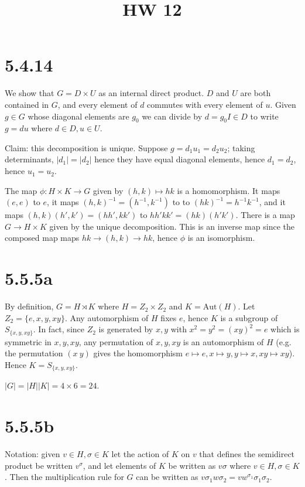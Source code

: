 \documentclass{article}
\title{HW 12}
\date{}
\def\inv{{-1}}
\def\Aut{\textrm{Aut}}
\begin{document}
\maketitle

\section*{5.4.14}

We show that $G = D \times U$ as an internal direct product. $D$ and $U$ are both contained in $G$, and every element of $d$ commutes with every element of $u$. Given $g \in G$ whose diagonal elements are $g_0$ we can divide by $d = g_0I \in D$ to write $g = d u$ where $d \in D, u \in U$.

Claim: this decomposition is unique. Suppose $g = d_1 u_1 = d_2 u_2$; taking determinants, $|d_1| = |d_2|$ hence they have equal diagonal elements, hence $d_1 = d_2$, hence $u_1 = u_2$.

The map $\phi: H \times K \to G$ given by $(h, k) \mapsto h k$ is a homomorphism. It maps $(e, e)$ to $e$, it maps $(h, k)^\inv = (h^\inv, k^\inv)$ to to $(hk)^\inv = h^\inv k^\inv$, and it maps $(h, k)(h', k') = (hh', kk')$ to $hh'kk' = (hk)(h'k')$. There is a map $G \to H \times K$ given by the unique decomposition. This is an inverse map since the composed map maps $hk \to (h, k) \to hk$, hence $\phi$ is an isomorphism.

\section*{5.5.5a}

By definition, $G = H \rtimes K$ where $H = Z_2 \times Z_2$ and $K = \Aut(H)$. Let $Z_2 = \{e, x, y, xy\}$. Any automorphism of $H$ fixes $e$, hence $K$ is a subgroup of $S_{\{x, y, xy\}}$. In fact, since $Z_2$ is generated by $x, y$ with $x^2 = y^2 = (xy)^2 = e$ which is symmetric in $x, y, xy$, any permutation of $x, y, xy$ is an automorphism of $H$ (e.g. the permutation $(x\ y)$ gives the homomorphism $e \mapsto e, x \mapsto y, y \mapsto x, xy \mapsto xy$). Hence $K = S_{\{x, y, xy\}}$.

$|G| = |H||K| = 4 \times 6 = 24$.

\section*{5.5.5b}

Notation: given $v \in H, \sigma \in K$ let the action of $K$ on $v$ that defines the semidirect product be written $v^\sigma$, and let elements of $K$ be written as $v \sigma$ where $v \in H, \sigma \in K$. Then the multiplication rule for $G$ can be written as $v \sigma_1 w \sigma_2 = vw^{\sigma_1} \sigma_1 \sigma_2$.
\end{document}
